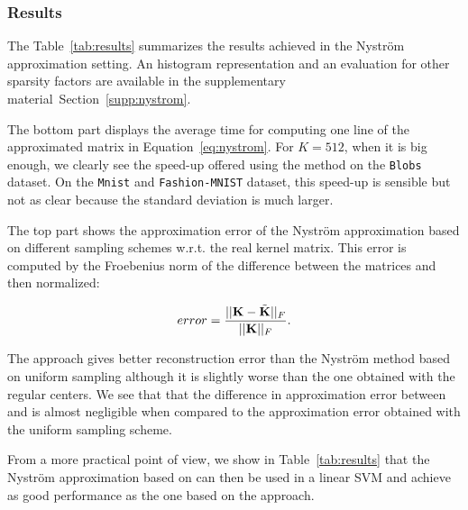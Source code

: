\subsubsection{Results}

The Table~\ref{tab:results} summarizes the results achieved in the Nyström approximation setting. An histogram representation and an evaluation for other sparsity factors are available in the supplementary material~Section~\ref{supp:nystrom}.

The bottom part displays the average time for computing one line of the approximated matrix in Equation~\ref{eq:nystrom}. For $K=512$, when it is big enough, we clearly see the speed-up offered using the \qkmeans method on the \texttt{Blobs} dataset. On the \texttt{Mnist} and \texttt{Fashion-MNIST} dataset, this speed-up is sensible but not as clear because the standard deviation is much larger. 

The top part shows the approximation error of the Nyström approximation based on different sampling schemes w.r.t. the real kernel matrix. This error is computed by the Froebenius norm of the difference between the matrices and then normalized:

\begin{equation}
 error = \frac{||{\mathbf{K}} - \tilde{{\mathbf{K}}}||_F}{||{\mathbf{K}}||_F}.
\end{equation}

The \qkmeans approach gives better reconstruction error than the Nyström method based on uniform sampling although it is slightly worse than the one obtained with the regular \kmeans centers. We see that that the difference in approximation error between \kmeans and \qkmeans is almost negligible when compared to the approximation error obtained with the uniform sampling scheme.

From a more practical point of view, we show in Table~\ref{tab:results} that the Nyström approximation based on \qkmeans can then be used in a linear SVM and achieve as good performance as the one based on the \kmeans approach.









